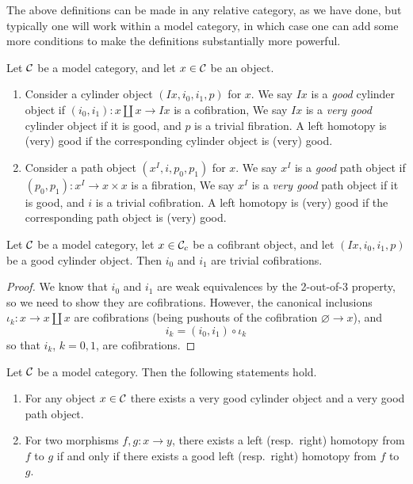 The above definitions can be made in any relative category, as we have done, but typically one will work within a model category, in which case one can add some more conditions
to make the definitions substantially more powerful.
\begin{definition}
	Let \(\mathcal{C}\) be a model category, and let \(x\in\mathcal{C}\) be an object.
	\begin{enumerate}[label=(\roman*)]
		\item Consider a cylinder object \((Ix,i_0,i_1,p)\) for \(x\). We say \(Ix\) is a \emph{good} cylinder object if \((i_0,i_1)\!:x\amalg x\to Ix\) is a cofibration,
		We say \(Ix\) is a \emph{very good} cylinder object if it is good, and \(p\) is a trivial fibration. A left homotopy is (very) good if the corresponding cylinder object is (very) good.
		\item Consider a path object \((x^I,i,p_0,p_1)\) for \(x\). We say \(x^I\) is a \emph{good} path object if \((p_0,p_1)\!:x^I\to x\times x\) is a fibration,
		We say \(x^I\) is a \emph{very good} path object if it is good, and \(i\) is a trivial cofibration. A left homotopy is (very) good if the corresponding path object is (very) good.
	\end{enumerate}
\end{definition}
\begin{lemma}\label{lemma:model-category-good-cylinder-of-cofibrant-object-inclusions-cofibrant}
	Let \(\mathcal{C}\) be a model category, let \(x\in\mathcal{C}_c\) be a cofibrant object, and let \((Ix,i_0,i_1,p)\) be a good cylinder object. Then \(i_0\) and \(i_1\)
	are trivial cofibrations.
\end{lemma}
\begin{proof}
We know that \(i_0\) and \(i_1\) are weak equivalences by the 2-out-of-3 property, so we need to show they are cofibrations. However,
the canonical inclusions \(\iota_k\!:x\to x\amalg x\) are cofibrations (being pushouts of the cofibration \(\varnothing\to x\)), and
\[ i_k = (i_0,i_1)\circ\iota_k \]
so that \(i_k\), \(k=0,1\), are cofibrations.
\end{proof}
\begin{proposition}\label{prop:model-category-good-homotopies-are-enough}
	Let \(\mathcal{C}\) be a model category. Then the following statements hold.
	\begin{enumerate}[label=(\arabic*)]
		\item For any object \(x\in\mathcal{C}\) there exists a very good cylinder object and a very good path object.
		\item For two morphisms \(f,g\!:x\to y\), there exists a left (resp.\ right) homotopy from \(f\) to \(g\) if and only if there exists a good left (resp.\ right) homotopy from \(f\) to \(g\).
	\end{enumerate}
\end{proposition}
